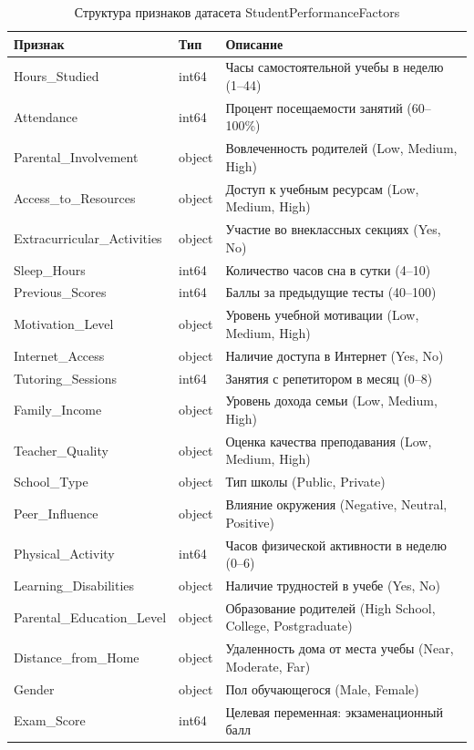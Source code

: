 \documentclass[14pt,a4paper]{extarticle}
\begin{document}
\begin{table}[H]
\caption{Структура признаков датасета StudentPerformanceFactors}
\centering
\small
\begin{tabularx}{\textwidth}{|l|l|X|}
\hline
\textbf{Признак} & \textbf{Тип} & \textbf{Описание} \\
\hline
Hours\_Studied & int64 & Часы самостоятельной учебы в неделю (1--44) \\
Attendance & int64 & Процент посещаемости занятий (60--100\%) \\
Parental\_Involvement & object & Вовлеченность родителей (Low, Medium, High) \\
Access\_to\_Resources & object & Доступ к учебным ресурсам (Low, Medium, High) \\
Extracurricular\_Activities & object & Участие во внеклассных секциях (Yes, No) \\
Sleep\_Hours & int64 & Количество часов сна в сутки (4--10) \\
Previous\_Scores & int64 & Баллы за предыдущие тесты (40--100) \\
Motivation\_Level & object & Уровень учебной мотивации (Low, Medium, High) \\
Internet\_Access & object & Наличие доступа в Интернет (Yes, No) \\
Tutoring\_Sessions & int64 & Занятия с репетитором в месяц (0--8) \\
Family\_Income & object & Уровень дохода семьи (Low, Medium, High) \\
Teacher\_Quality & object & Оценка качества преподавания (Low, Medium, High) \\
School\_Type & object & Тип школы (Public, Private) \\
Peer\_Influence & object & Влияние окружения (Negative, Neutral, Positive) \\
Physical\_Activity & int64 & Часов физической активности в неделю (0--6) \\
Learning\_Disabilities & object & Наличие трудностей в учебе (Yes, No) \\
Parental\_Education\_Level & object & Образование родителей (High School, College, Postgraduate) \\
Distance\_from\_Home & object & Удаленность дома от места учебы (Near, Moderate, Far) \\
Gender & object & Пол обучающегося (Male, Female) \\
Exam\_Score & int64 & Целевая переменная: экзаменационный балл \\
\hline
\end{tabularx}
\end{table}
\end{document}
